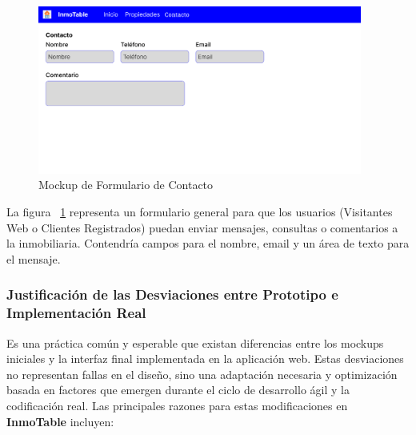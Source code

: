 \begin{figure}[H]
    \begin{center}
        \includegraphics[width = 0.95\textwidth]{Figuras/mockup_5_contacto.png}
    \end{center}
    \caption{\label{fig:mockup_5_contacto} Mockup de Formulario de Contacto}
\end{figure}

La figura ~\ref{fig:mockup_5_contacto} representa un formulario general para que los usuarios (Visitantes Web o Clientes Registrados) puedan enviar mensajes, consultas o comentarios a la inmobiliaria. Contendría campos para el nombre, email y un área de texto para el mensaje.


\subsubsection{Justificación de las Desviaciones entre Prototipo e Implementación Real}


Es una práctica común y esperable que existan diferencias entre los mockups iniciales y la interfaz final implementada en la aplicación web. Estas desviaciones no representan fallas en el diseño, sino una adaptación necesaria y optimización basada en factores que emergen durante el ciclo de desarrollo ágil y la codificación real. Las principales razones para estas modificaciones en \textbf{InmoTable} incluyen:

